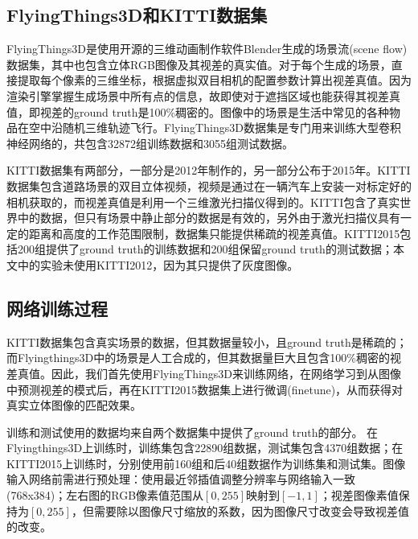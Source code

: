 \subsection{FlyingThings3D和KITTI数据集}
FlyingThings3D\cite{mayer2016large}是使用开源的三维动画制作软件Blender生成的场景流(scene flow)数据集，其中也包含立体RGB图像及其视差的真实值。对于每个生成的场景，直接提取每个像素的三维坐标，根据虚拟双目相机的配置参数计算出视差真值。因为渲染引擎掌握生成场景中所有点的信息，故即使对于遮挡区域也能获得其视差真值，即视差的ground truth是100\%稠密的。图像中的场景是生活中常见的各种物品在空中沿随机三维轨迹飞行。FlyingThings3D数据集是专门用来训练大型卷积神经网络的，共包含32872组训练数据和3055组测试数据。

KITTI数据集有两部分，一部分是2012年制作的\cite{Geiger2012}，另一部分公布于2015年\cite{Menze_2015_CVPR}。KITTI数据集包含道路场景的双目立体视频，视频是通过在一辆汽车上安装一对标定好的相机获取的，而视差真值是利用一个三维激光扫描仪得到的。KITTI包含了真实世界中的数据，但只有场景中静止部分的数据是有效的，另外由于激光扫描仪具有一定的距离和高度的工作范围限制，数据集只能提供稀疏的视差真值。KITTI2015包括200组提供了ground truth的训练数据和200组保留ground truth的测试数据；本文中的实验未使用KITTI2012，因为其只提供了灰度图像。


\subsection{网络训练过程}
KITTI数据集包含真实场景的数据，但其数据量较小，且ground truth是稀疏的；而Flyingthings3D中的场景是人工合成的，但其数据量巨大且包含100\%稠密的视差真值。因此，我们首先使用FlyingThings3D来训练网络，在网络学习到从图像中预测视差的模式后，再在KITTI2015数据集上进行微调(finetune)，从而获得对真实立体图像的匹配效果。

训练和测试使用的数据均来自两个数据集中提供了ground truth的部分。
在Flyingthings3D上训练时，训练集包含22890组数据，测试集包含4370组数据；在KITTI2015上训练时，分别使用前160组和后40组数据作为训练集和测试集。图像输入网络前需进行预处理：使用最近邻插值调整分辨率与网络输入一致(768x384)；左右图的RGB像素值范围从$[0, 255]$映射到$[-1, 1]$；视差图像素值保持为$[0, 255]$，但需要除以图像尺寸缩放的系数，因为图像尺寸改变会导致视差值的改变。

